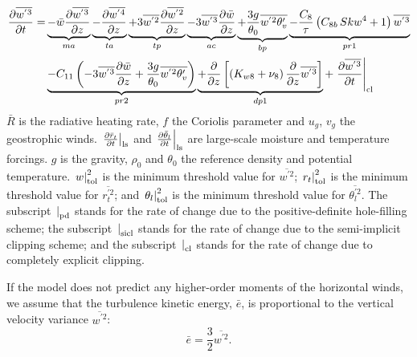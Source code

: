 \documentclass[11pt,fleqn]{article}
\newcommand{\ptlder}[2]{\frac{\partial #1}{\partial #2}}
\begin{document}
%
\begin{equation}
\label{eq_wp3}
\begin{split}
\ptlder{\overline{w^{'3}}}{t}
= & \underbrace{ - \bar{w}\ptlder{\overline{w^{'3}}}{z} }_{ma}
    \underbrace{ - \ptlder{\overline{w^{'4}}}{z} }_{ta}
    \underbrace{ + 3\overline{w^{'2}}\ptlder{\overline{w^{'2}}}{z} }_{tp}
    \underbrace{ - 3\overline{w^{'3}}\ptlder{\bar{w}}{z} }_{ac}
    \underbrace{ + \frac{3g}{\theta_0} \overline{w^{'2}\theta'_v} }_{bp}
    \underbrace{ - \frac{C_8}{\tau}\left( C_{8b} \, Skw^4 + 1 \right) \overline{w^{'3}} }_{pr1}\\
  & \underbrace{ - C_{11} \left(
                 - 3 \overline{w^{'3}}\ptlder{\bar{w}}{z}
                 + \frac{3g}{\theta_0} \overline{w^{'2}\theta'_v}
             \right) }_{pr2}
    \underbrace{ + \ptlder{}{z} \left[ \left( K_{w8} + \nu_8 \right)
                          \ptlder{}{z} \overline{w^{'3}} 
                   \right] }_{dp1}
    + \left. \ptlder{\overline{w^{'3}}}{t} \right|_{\rm{cl}}
\end{split}
\end{equation}
%
$\bar{R}$ is the radiative heating rate, 
$f$ the Coriolis parameter and $u_g$, $v_g$ the geostrophic winds.
$\left. \ptlder{\bar{r}_t}{t} \right|_{\rm ls}$ and 
$\left. \ptlder{\bar{\theta}_l}{t} \right|_{\rm ls}$ are
large-scale moisture and temperature forcings.
$g$ is the gravity, $\rho_0$ and $\theta_0$ the reference
density and potential temperature.
$\left. w \right|_{\rm{tol}}^{2}$ is the minimum threshold value
for $\overline{w^{'2}}$; 
$\left. r_t \right|_{\rm{tol}}^{2}$ is the minimum threshold value
for $\overline{r_t^{'2}}$; and 
$\left. \theta_l \right|_{\rm{tol}}^{2}$ is the minimum threshold value
for $\overline{\theta_l^{'2}}$.
The subscript $\left.\right|_{\rm{pd}}$ stands for the rate of change due to the
positive-definite hole-filling scheme; the subscript $\left.\right|_{\rm{sicl}}$
stands for the rate of change due to the semi-implicit clipping scheme; and the 
subscript $\left.\right|_{\rm{cl}}$ stands for the rate of change due to 
completely explicit clipping.

If the model does not predict any higher-order moments of the
horizontal winds, we assume that the turbulence kinetic energy, $\bar{e}$,
is proportional to the vertical velocity variance $\overline{w^{'2}}$:
%
\begin{equation}
\label{eq_tke}
\bar{e} = \frac{3}{2} \overline{w^{'2}}.
\end{equation}
%
\end{document}
